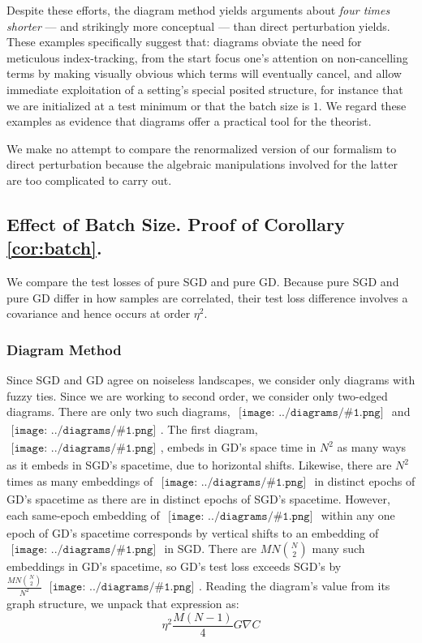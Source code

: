 \documentclass{article}
\theoremstyle{plain}
\theoremstyle{definition}
\newcommand{\sdia}[1]{\begin{gathered}\texttt{[image: ../diagrams/\#1.png]}\end{gathered}}
\begin{document}
    Despite these efforts, the diagram method yields arguments about \emph{four
    times shorter} --- and strikingly more conceptual --- than direct
    perturbation yields.  These examples specifically suggest that: diagrams
    obviate the need for meticulous index-tracking, from the start focus one's
    attention on non-cancelling terms by making visually obvious which terms
    will eventually cancel, and allow immediate exploitation of a setting's
    special posited structure, for instance that we are initialized at a test
    minimum or that the batch size is $1$.  We regard these examples as
    evidence that diagrams offer a practical tool for the theorist.

    We make no attempt to compare the renormalized version of our formalism
    to direct perturbation because the algebraic manipulations involved for
    the latter are too complicated to carry out.  

    \subsection{
        Effect of Batch Size.
        Proof of Corollary \ref{cor:batch}.
    }
        We compare the test losses of pure SGD and pure GD.  Because pure
        SGD and pure GD differ in how samples are correlated, their test loss
        difference involves a covariance and hence occurs at order $\eta^2$.  

        \subsubsection*{Diagram Method}
        \begin{shaded}
            Since SGD and GD agree on noiseless landscapes, we consider only
            diagrams with fuzzy ties.  Since we are working to second order, we
            consider only two-edged diagrams.  There are only two such
            diagrams, $\sdia{(01-2)(02-12)}$ and $\sdia{(01-2)(01-12)}$.  The
            first diagram, $\sdia{(01-2)(02-12)}$, embeds in GD's space time in
            $N^2$ as many ways as it embeds in SGD's spacetime, due to
            horizontal shifts.  Likewise, there are $N^2$ times as many
            embeddings of $\sdia{(01-2)(02-12)}$ in distinct epochs of GD's
            spacetime as there are in distinct epochs of SGD's spacetime.
            However, each same-epoch embedding of $\sdia{(01-2)(01-12)}$ within
            any one epoch of GD's spacetime corresponds by vertical shifts to
            an embedding of $\sdia{(0-1-2)(01-12)}$ in SGD.  There are
            $MN{N\choose 2}$ many such embeddings in GD's spacetime, so GD's
            test loss exceeds SGD's by 
            $
                \frac{MN{N\choose 2}}{N^2}~
                \sdia{c(01-2)(01-12)}
            $.
            Reading the diagram's value from its graph structure, we
            unpack that expression as:
            $$
                \eta^2 \frac{M(N-1)}{4} G \nabla C 
            $$
        \end{shaded}
\end{document}
